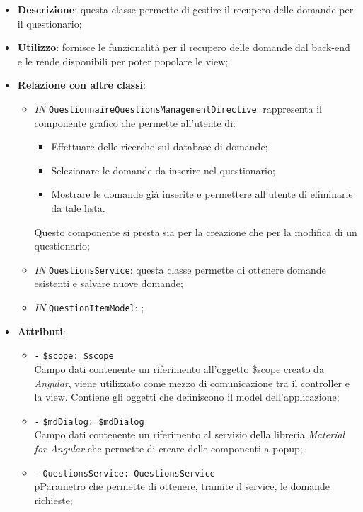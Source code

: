\begin{itemize}
	\item \textbf{Descrizione}: questa classe permette di gestire il recupero delle domande per il questionario;
	\item \textbf{Utilizzo}: fornisce le funzionalità per il recupero delle domande dal back-end e le rende disponibili per poter popolare le view;
	\item \textbf{Relazione con altre classi}:
	\begin{itemize}
		\item \textit{IN} \texttt{QuestionnaireQuestionsManagementDirective}: rappresenta il componente grafico che permette all'utente di:
		\begin{itemize}
			\item Effettuare delle ricerche sul database di domande;
			\item Selezionare le domande da inserire nel questionario;
			\item Mostrare le domande già inserite e permettere all'utente di eliminarle da tale lista.
		\end{itemize}
		Questo componente si presta sia per la creazione che per la modifica di un questionario;
		\item \textit{IN} \texttt{QuestionsService}: questa classe permette di ottenere domande esistenti e salvare nuove domande;
		\item \textit{IN} \texttt{QuestionItemModel}: ;
	\end{itemize}
	\item \textbf{Attributi}:
	\begin{itemize}
		\item \texttt{-} \texttt{\$scope: \$scope} \\
		Campo dati contenente un riferimento all’oggetto \$scope creato da \textit{Angular}, viene utilizzato come mezzo di comunicazione tra il controller e la view. Contiene gli oggetti che definiscono il model dell’applicazione;
		\item \texttt{-} \texttt{\$mdDialog: \$mdDialog} \\
		Campo dati contenente un riferimento al servizio della libreria \textit{Material for Angular} che permette di creare delle componenti a popup;
		\item \texttt{-} \texttt{QuestionsService: QuestionsService}\\ pParametro che permette di ottenere, tramite il service, le domande richieste;
	\end{itemize}

\end{itemize}
